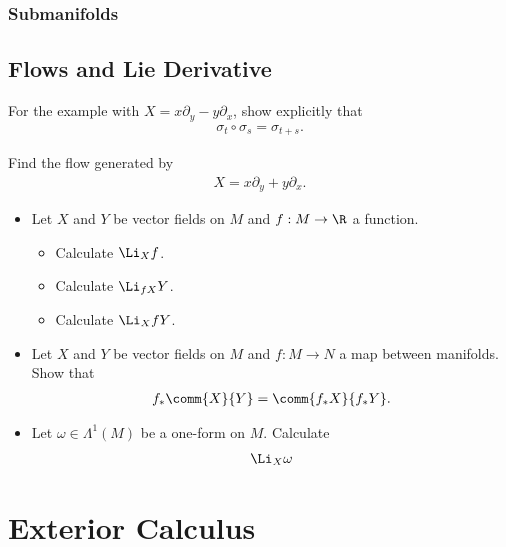 \subsection{Submanifolds}

\section{Flows and Lie Derivative}

\begin{Ebox}
  For the example with $X=x\partial_y -y\partial_x$, show explicitly that 
  \begin{align}
    \sigma_t\circ \sigma_s = \sigma_{t+s}.
  \end{align}
\end{Ebox}


\begin{Ebox}
  Find the flow generated by
  \begin{align}
    X = x\partial_y +y\partial_x.
  \end{align}
\end{Ebox}

\begin{Ebox}
  \begin{itemize}
  \item Let $X$ and $Y$ be vector fields on $M$ and $f:M\to\R$ a function.
    \begin{itemize}
    \item Calculate $\Li_{X}f$.
    \item Calculate $\Li_{fX}Y$.
    \item Calculate $\Li_{X}fY$.
    \end{itemize}
  \item  Let $X$ and $Y$ be vector fields on $M$ and $f:M\to N$ a map between manifolds. Show that
    \begin{align}
      f_*\comm{X}{Y} =\comm{f_*X}{f_*Y}.
    \end{align}
  \item Let $\omega\in\Lambda^1(M)$ be a one-form on $M$. Calculate
    \begin{align}
      \Li_X \omega
    \end{align}
  \end{itemize}
\end{Ebox}




\chapter{Exterior Calculus}

